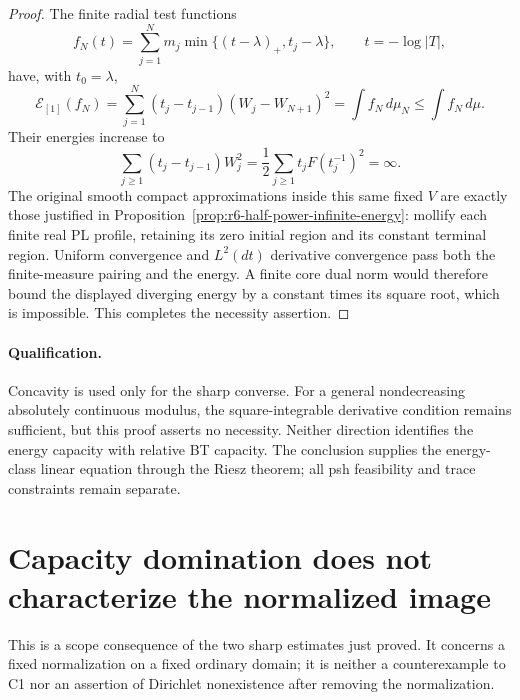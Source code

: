 \documentclass[11pt,a4paper]{article}
\numberwithin{equation}{section}
\theoremstyle{definition}
\theoremstyle{remark}
\begin{document}
\begin{proof}
The finite radial test functions
\[
          f_N(t)=\sum_{j=1}^Nm_j
                       \min\{(t-\lambda)_+,t_j-\lambda\},
                       \qquad t=-\log|T|,
\]
have, with $t_0=\lambda$,
\[
 \mathcal E_{[1]}(f_N)
   =\sum_{j=1}^N(t_j-t_{j-1})(W_j-W_{N+1})^2
   =\int f_N\,d\mu_N\le\int f_N\,d\mu.
\]
Their energies increase to
\[
       \sum_{j\ge1}(t_j-t_{j-1})W_j^2
                =\frac12\sum_{j\ge1}t_jF(t_j^{-1})^2=\infty.
\]
The original smooth compact approximations inside this same fixed
$V$ are exactly those justified in
Proposition~\ref{prop:r6-half-power-infinite-energy}: mollify each
finite real PL profile, retaining its zero initial region and its
constant terminal region. Uniform convergence and $L^2(dt)$
derivative convergence pass both the finite-measure pairing and
the energy. A finite core dual norm would therefore bound the
displayed diverging energy by a constant times its square root,
which is impossible. This completes the necessity assertion.
\end{proof}

\paragraph{Qualification.}
Concavity is used only for the sharp converse. For a general
nondecreasing absolutely continuous modulus, the square-integrable
derivative condition remains sufficient, but this proof asserts
no necessity. Neither direction identifies the energy capacity
with relative BT capacity. The conclusion supplies the energy-class
linear equation through the Riesz theorem; all psh feasibility and
trace constraints remain separate.



\section{Capacity domination does not characterize the normalized image}
\label{sec:r6-normalized-image-obstruction}

This is a scope consequence of the two sharp estimates just proved.
It concerns a fixed normalization on a fixed ordinary domain; it is
neither a counterexample to C1 nor an assertion of Dirichlet
nonexistence after removing the normalization.
\end{document}

